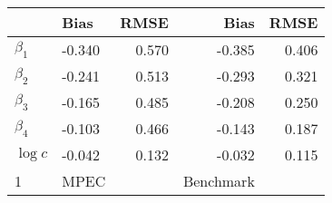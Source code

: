 
\begin{tabular}[t]{llrrr}
\toprule
  & Bias & RMSE & Bias & RMSE\\
\midrule
$\beta_{1}$ & -0.340 & 0.570 & -0.385 & 0.406\\
$\beta_{2}$ & -0.241 & 0.513 & -0.293 & 0.321\\
$\beta_{3}$ & -0.165 & 0.485 & -0.208 & 0.250\\
$\beta_{4}$ & -0.103 & 0.466 & -0.143 & 0.187\\
$\log c$ & -0.042 & 0.132 & -0.032 & 0.115\\
1 & MPEC &  & Benchmark & \\
\bottomrule
\end{tabular}
